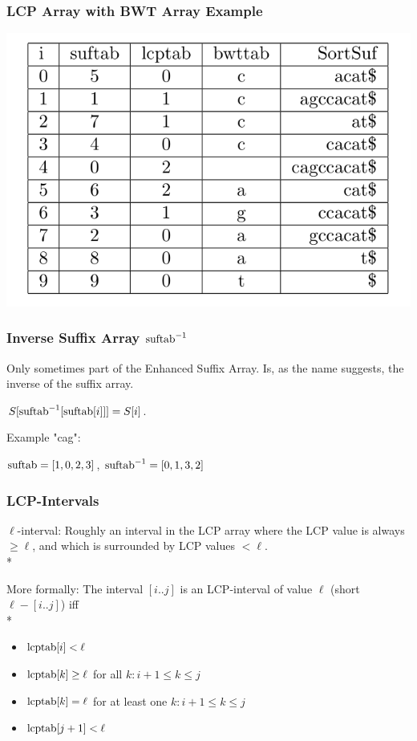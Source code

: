 \documentclass[compress,handout]{beamer} %
\begin{document}
\begin{frame}
	\frametitle{LCP Array with BWT Array Example}
        \includegraphics[width=\textwidth, height=\textheight, keepaspectratio=true]{esa_with_bwttab_example}
\end{frame}

\begin{frame}
	\frametitle{Inverse Suffix Array $\hbox{suftab}^{-1}$}
	Only sometimes part of the Enhanced Suffix Array.
	Is, as the name suggests, the inverse of the suffix array.

	$S[\hbox{suftab}^{-1}[\hbox{suftab}[i]]]=S[i]$.

	Example "cag":

	$\hbox{suftab}=[1,0,2,3]$, $\hbox{suftab}^{-1}=[0,1,3,2]$
\end{frame}

\begin{frame}
	\frametitle{LCP-Intervals}
	$\ell$-interval: Roughly an interval in the LCP array where the LCP value is always
	$\ge \ell$, and which is surrounded by LCP values $< \ell$.\\*

	\vspace{5mm}
	More formally:
	The interval $[i..j]$ is an LCP-interval of value $\ell$ (short $\ell-[i..j]$)
	iff \\*
	\begin{itemize}
		\item $\hbox{lcptab}[i]<\ell$
		\item $\hbox{lcptab}[k]\ge \ell$ for all $k: i+1 \le k \le j$
		\item $\hbox{lcptab}[k]=\ell$ for at least one $k: i+1 \le k \le j$
		\item $\hbox{lcptab}[j+1]<\ell$
	\end{itemize}
\end{frame}
\end{document}
